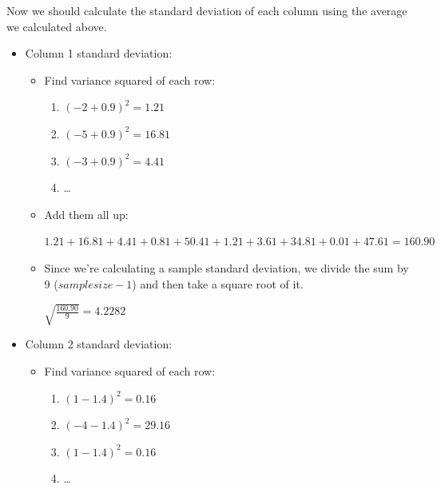 \documentclass[12pt]{article}
\begin{document}
\noindent
Now we should calculate the standard deviation of each column using the average we calculated above.\\
\begin{itemize}
    \item
    Column 1 standard deviation:\\
    
    \begin{itemize}
        \item
        Find variance squared of each row:\\
        
        \begin{enumerate}
            \item
            $ (-2+0.9)^2 = 1.21$
            \item
            $ (-5+0.9)^2 = 16.81$
            \item
            $ (-3+0.9)^2 = 4.41$
            \item
            \ldots
        \end{enumerate}
        
        \item
        Add them all up:\\
        \begin{center}
            $1.21+16.81+4.41+0.81+50.41+1.21+3.61+34.81+0.01+47.61 = 160.90$
        \end{center}
        
        \item
        Since we're calculating a sample standard deviation, we divide the sum by 9 ($sample size - 1$) and then take a square root of it.\\
        \begin{center}
            $\sqrt{\frac{160.90}{9}} = 4.2282$
        \end{center}
        
    \end{itemize}
    
    \item
    Column 2 standard deviation:\\
    
    \begin{itemize}
        \item
        Find variance squared of each row:\\
        
        \begin{enumerate}
            \item
            $ (1-1.4)^2 = 0.16$
            \item
            $ (-4-1.4)^2 = 29.16$
            \item
            $ (1-1.4)^2 = 0.16$
            \item
            \ldots
        \end{enumerate}
        

\end{itemize}
\end{itemize}
\end{document}

